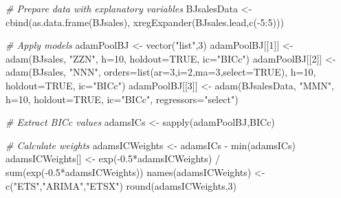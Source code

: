 \documentclass[
]{book}
\newenvironment{Shaded}{\begin{snugshade}}{\end{snugshade}}
\newcommand{\AttributeTok}[1]{\textcolor[rgb]{0.77,0.63,0.00}{#1}}
\newcommand{\CommentTok}[1]{\textcolor[rgb]{0.56,0.35,0.01}{\textit{#1}}}
\newcommand{\ConstantTok}[1]{\textcolor[rgb]{0.00,0.00,0.00}{#1}}
\newcommand{\DecValTok}[1]{\textcolor[rgb]{0.00,0.00,0.81}{#1}}
\newcommand{\FloatTok}[1]{\textcolor[rgb]{0.00,0.00,0.81}{#1}}
\newcommand{\FunctionTok}[1]{\textcolor[rgb]{0.00,0.00,0.00}{#1}}
\newcommand{\NormalTok}[1]{#1}
\newcommand{\OtherTok}[1]{\textcolor[rgb]{0.56,0.35,0.01}{#1}}
\newcommand{\SpecialCharTok}[1]{\textcolor[rgb]{0.00,0.00,0.00}{#1}}
\newcommand{\StringTok}[1]{\textcolor[rgb]{0.31,0.60,0.02}{#1}}
\theoremstyle{definition}
\theoremstyle{definition}
\theoremstyle{definition}
\theoremstyle{definition}
\theoremstyle{remark}
\begin{document}
\begin{Shaded}
\begin{Highlighting}[]
\CommentTok{\# Prepare data with explanatory variables}
\NormalTok{BJsalesData }\OtherTok{\textless{}{-}} \FunctionTok{cbind}\NormalTok{(}\FunctionTok{as.data.frame}\NormalTok{(BJsales),}
                     \FunctionTok{xregExpander}\NormalTok{(BJsales.lead,}\FunctionTok{c}\NormalTok{(}\SpecialCharTok{{-}}\DecValTok{5}\SpecialCharTok{:}\DecValTok{5}\NormalTok{)))}

\CommentTok{\# Apply models}
\NormalTok{adamPoolBJ }\OtherTok{\textless{}{-}} \FunctionTok{vector}\NormalTok{(}\StringTok{"list"}\NormalTok{,}\DecValTok{3}\NormalTok{)}
\NormalTok{adamPoolBJ[[}\DecValTok{1}\NormalTok{]] }\OtherTok{\textless{}{-}} \FunctionTok{adam}\NormalTok{(BJsales, }\StringTok{"ZZN"}\NormalTok{,}
                        \AttributeTok{h=}\DecValTok{10}\NormalTok{, }\AttributeTok{holdout=}\ConstantTok{TRUE}\NormalTok{,}
                        \AttributeTok{ic=}\StringTok{"BICc"}\NormalTok{)}
\NormalTok{adamPoolBJ[[}\DecValTok{2}\NormalTok{]] }\OtherTok{\textless{}{-}} \FunctionTok{adam}\NormalTok{(BJsales, }\StringTok{"NNN"}\NormalTok{,}
                        \AttributeTok{orders=}\FunctionTok{list}\NormalTok{(}\AttributeTok{ar=}\DecValTok{3}\NormalTok{,}\AttributeTok{i=}\DecValTok{2}\NormalTok{,}\AttributeTok{ma=}\DecValTok{3}\NormalTok{,}\AttributeTok{select=}\ConstantTok{TRUE}\NormalTok{),}
                        \AttributeTok{h=}\DecValTok{10}\NormalTok{, }\AttributeTok{holdout=}\ConstantTok{TRUE}\NormalTok{,}
                        \AttributeTok{ic=}\StringTok{"BICc"}\NormalTok{)}
\NormalTok{adamPoolBJ[[}\DecValTok{3}\NormalTok{]] }\OtherTok{\textless{}{-}} \FunctionTok{adam}\NormalTok{(BJsalesData, }\StringTok{"MMN"}\NormalTok{,}
                        \AttributeTok{h=}\DecValTok{10}\NormalTok{, }\AttributeTok{holdout=}\ConstantTok{TRUE}\NormalTok{,}
                        \AttributeTok{ic=}\StringTok{"BICc"}\NormalTok{,}
                        \AttributeTok{regressors=}\StringTok{"select"}\NormalTok{)}

\CommentTok{\# Extract BICc values}
\NormalTok{adamsICs }\OtherTok{\textless{}{-}} \FunctionTok{sapply}\NormalTok{(adamPoolBJ,BICc)}

\CommentTok{\# Calculate weights}
\NormalTok{adamsICWeights }\OtherTok{\textless{}{-}}\NormalTok{ adamsICs }\SpecialCharTok{{-}} \FunctionTok{min}\NormalTok{(adamsICs)}
\NormalTok{adamsICWeights[] }\OtherTok{\textless{}{-}} \FunctionTok{exp}\NormalTok{(}\SpecialCharTok{{-}}\FloatTok{0.5}\SpecialCharTok{*}\NormalTok{adamsICWeights) }\SpecialCharTok{/}
                    \FunctionTok{sum}\NormalTok{(}\FunctionTok{exp}\NormalTok{(}\SpecialCharTok{{-}}\FloatTok{0.5}\SpecialCharTok{*}\NormalTok{adamsICWeights))}
\FunctionTok{names}\NormalTok{(adamsICWeights) }\OtherTok{\textless{}{-}} \FunctionTok{c}\NormalTok{(}\StringTok{"ETS"}\NormalTok{,}\StringTok{"ARIMA"}\NormalTok{,}\StringTok{"ETSX"}\NormalTok{)}
\FunctionTok{round}\NormalTok{(adamsICWeights,}\DecValTok{3}\NormalTok{)}
\end{Highlighting}
\end{Shaded}
\end{document}
